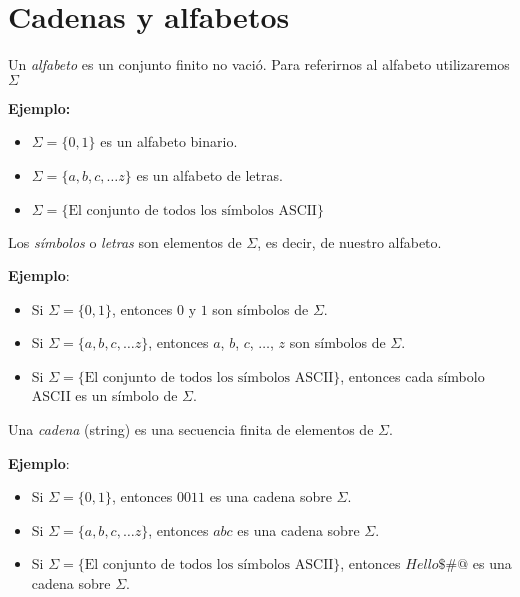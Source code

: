 \section{Cadenas y alfabetos}

\begin{Def}
Un \textit{alfabeto} es un conjunto finito no vació. Para referirnos al alfabeto utilizaremos $\Sigma$ 
\end{Def}

\textbf{Ejemplo:}
\begin{itemize}
\item  $\Sigma = \{0,1\}$ es un alfabeto binario.
\item  $\Sigma = \{a,b,c, \ldots z\}$ es un alfabeto de letras.
\item  $\Sigma = \{\text{El conjunto de todos los símbolos ASCII} \}$
\end{itemize}

\begin{Def}
Los \textit{símbolos} o \textit{letras} son elementos de $\Sigma$, es decir, de nuestro alfabeto. 
\end{Def}
\textbf{Ejemplo}:

\begin{itemize}
\item Si $\Sigma = \{0,1\}$, entonces $0$ y $1$ son símbolos de $\Sigma$.
\item Si $\Sigma = \{a,b,c, \ldots z\}$, entonces $a$, $b$, $c$, $\ldots$, $z$ son símbolos de $\Sigma$.
\item Si $\Sigma = \{\text{El conjunto de todos los símbolos ASCII} \}$, entonces cada símbolo ASCII es un símbolo de $\Sigma$.
\end{itemize}

\begin{Def}
Una \textit{cadena} (string) es una secuencia finita de elementos de $\Sigma$.
\end{Def}

\textbf{Ejemplo}:
\begin{itemize}
\item Si $\Sigma = \{0,1\}$, entonces $0011$ es una cadena sobre $\Sigma$.
\item Si $\Sigma = \{a,b,c, \ldots z\}$, entonces $abc$ es una cadena sobre $\Sigma$.
\item Si $\Sigma = \{\text{El conjunto de todos los símbolos ASCII} \}$, entonces $Hello\$\#@$ es una cadena sobre $\Sigma$.
\end{itemize}

